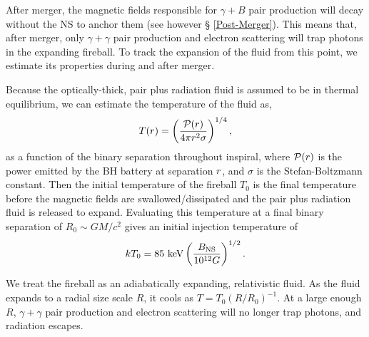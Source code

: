 After merger, the magnetic fields responsible for $\gamma + B$ pair
production will decay without the NS to anchor them (see however \S
\ref{Post-Merger}). This means that, after merger, only $\gamma +
\gamma$ pair production and electron scattering will trap photons in
the expanding fireball. To track the expansion of the fluid from this
point, we estimate its properties during and after merger.


Because the optically-thick, pair plus radiation fluid is assumed to
be in thermal equilibrium, we can estimate the temperature of the
fluid as,
\begin{align}
T(r) &=  \left( \frac{ \mathcal{P}(r) }{ 4 \pi r^2 \sigma } \right)^{1/4}, \nonumber \\
\end{align}
as a function of the binary separation throughout inspiral, where
$\mathcal{P}(r)$ is the power emitted by the BH battery at separation
$r$, and $\sigma$ is the Stefan-Boltzmann constant. Then the
initial temperature of the fireball $T_0$ is the final temperature
before the magnetic fields are swallowed/dissipated and the pair plus
radiation fluid is released to expand. Evaluating this temperature at
a final binary separation of $R_0 \sim GM/c^2$ gives an initial
injection temperature of
\begin{align}
kT_0= 85 \ \mbox{keV} \left( \frac{B_{\rm NS}}{10^{12} G} \right)^{1/2} .
\label{Eq:KTeff}
\end{align}

We treat the fireball as an adiabatically expanding, relativistic
fluid. As the fluid expands to a radial size scale $R$, it cools as $T
= T_0 (R/R_0)^{-1}$. At a large enough $R$, $\gamma + \gamma$ pair
production and electron scattering will no longer trap photons, and
radiation escapes.




